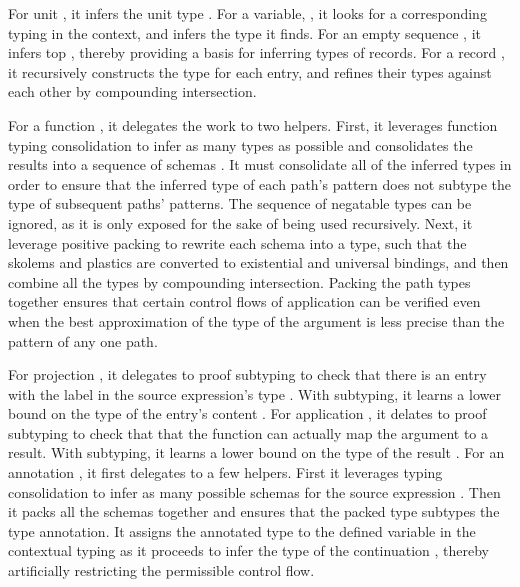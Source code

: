 \documentclass[acmsmall]{acmart}
\theoremstyle{definition}
\begin{document}
\noindent
For unit , it infers the unit type . 
For a variable, , it looks for a corresponding typing in the context, 
and infers the type it finds.
For an empty sequence \ms{\epsilon}, 
it infers top ,
thereby providing a basis for inferring types of records. 
For a record ,  
it recursively constructs the type for each entry, and
refines their types against each other by compounding intersection.

For a function ,  
it delegates the work to two helpers. 
First, it leverages function typing consolidation 
to infer as many types as possible
and consolidates the results into a sequence of schemas \ms{\Pi}.
It must consolidate all of the inferred types in order to
ensure that the inferred type of each 
path's pattern does not subtype the type of subsequent paths' patterns. 
The sequence of negatable types \ms{\Xi} can be ignored, as it is only
exposed for the sake of being used recursively.
Next, it leverage positive packing 
to rewrite each schema into a type,
such that the skolems and plastics are converted to
existential and universal bindings,
and then combine all the types by compounding intersection.
Packing the path types together ensures that certain
control flows of application can be verified even when  
the best approximation of the type of the argument
is less precise than the pattern of any one path.


For projection , 
it delegates to proof subtyping 
to check that there is an entry with the label 
in the source expression's type \ms{\tau}.
With subtyping, it learns a lower bound on the type of the entry's content \ms{\alpha}.
For application , 
it delates to proof subtyping 
to check that that the function  can actually
map the argument  to a result. With subtyping, 
it learns a lower bound on the type of the result \ms{\alpha}.
For an annotation , 
it first delegates to a few helpers. 
First it leverages typing consolidation 
to infer as many possible schemas for the source expression .
Then it packs all the schemas together and ensures that the packed type
subtypes the type annotation.
It assigns the annotated type to the defined variable in the contextual typing
as it proceeds to infer the type of the continuation , thereby
artificially restricting the permissible control flow. 
\end{document}
